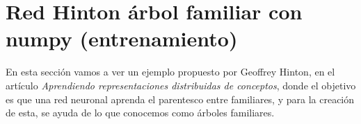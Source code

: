 \section{Red Hinton árbol familiar con numpy (entrenamiento)}

En esta sección vamos a ver un ejemplo propuesto por Geoffrey Hinton, en el artículo \emph{Aprendiendo representaciones distribuidas de conceptos}, donde el objetivo es que una red neuronal aprenda el parentesco entre familiares, y para la creación de esta, se ayuda de lo que conocemos como árboles familiares.
